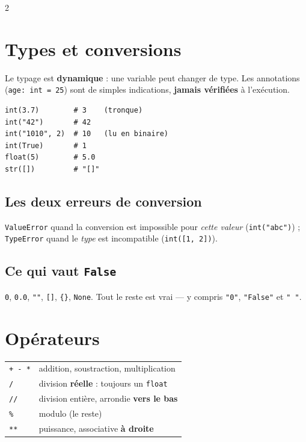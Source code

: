 \documentclass[a4paper,10pt]{article}
\newcommand{\co}[1]{\texttt{\textcolor{codefg}{#1}}}
\begin{document}
\vspace{0.5em}
\begin{multicols}{2}

\section{Types et conversions}

Le typage est \textbf{dynamique} : une variable peut changer de type. Les
annotations (\co{age: int = 25}) sont de simples indications, \textbf{jamais
vérifiées} à l'exécution.

\begin{lstlisting}
int(3.7)        # 3    (tronque)
int("42")       # 42
int("1010", 2)  # 10   (lu en binaire)
int(True)       # 1
float(5)        # 5.0
str([])         # "[]"
\end{lstlisting}

\subsection{Les deux erreurs de conversion}
\co{ValueError} quand la conversion est impossible pour \emph{cette valeur}
(\co{int("abc")}) ; \co{TypeError} quand le \emph{type} est incompatible
(\co{int([1, 2])}).

\subsection{Ce qui vaut \co{False}}
\co{0}, \co{0.0}, \co{""}, \co{[]}, \co{\{\}}, \co{None}. Tout le reste est
vrai --- y compris \co{"0"}, \co{"False"} et \co{" "}.

\section{Opérateurs}

\begin{tabularx}{\linewidth}{@{}l>{\raggedright\arraybackslash}X@{}}
\toprule
\co{+ - *} & addition, soustraction, multiplication \\
\co{/}     & division \textbf{réelle} : toujours un \co{float} \\
\co{//}    & division entière, arrondie \textbf{vers le bas} \\
\co{\%}    & modulo (le reste) \\
\co{**}    & puissance, associative \textbf{à droite} \\
\bottomrule
\end{tabularx}


\end{multicols}
\end{document}
